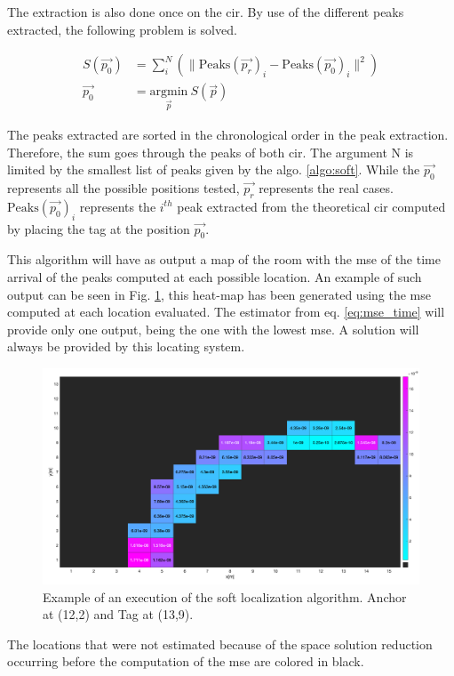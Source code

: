 The extraction is also done once on the \gls{cir}. By use of the different peaks extracted, the following problem is solved. 

\begin{equation}
\label{eq:mse_time}
\begin{aligned}
S(\vec{p_0}) &= \sum_i^N (\|\text{Peaks}(\vec{p_{r}})_i - \text{Peaks}(\vec{p_{0}})_i\| ^2 ) \\
\vec{p_0} &= \underset{\vec{p}}{\text{argmin}}~ S(\vec{p})
\end{aligned}
\end{equation}

The peaks extracted are sorted in the chronological order in the peak extraction. Therefore, the sum goes through the peaks of both \gls{cir}. The argument $\text{N}$ is limited by the smallest list of peaks given by the algo. \ref{algo:soft}. While the $\vec{p_0}$ represents all the possible positions tested, $\vec{p_r}$ represents the real cases. $\text{Peaks}(\vec{p_0})_i$ represents the $i^{th}$ peak extracted from the theoretical \gls{cir} computed by placing the tag at the position $\vec{p_0}$.
\vspace{2mm}

This algorithm will have as output a map of the room with the \gls{mse} of the time arrival of the peaks computed at each possible location. An example of such output can be seen in Fig. \ref{fig:mse_example}, this heat-map has been generated using the \gls{mse} computed at each location evaluated. The estimator from eq. \ref{eq:mse_time} will provide only one output, being the one with the lowest \gls{mse}. A solution will always be provided by this locating system. 
\vspace{2mm}

\begin{figure}[H]
\centering
\includegraphics[width=\linewidth]{Images/mse_map_algo.png}
\caption{Example of an execution of the soft localization algorithm. Anchor at (12,2) and Tag at (13,9).\label{fig:mse_example}}
\end{figure}

The locations that were not estimated because of the space solution reduction occurring before the computation of the \gls{mse} are colored in black.